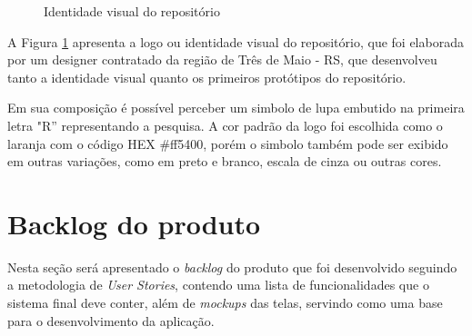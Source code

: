 \begin{figure}[H]
    \caption{Identidade visual do repositório}
    \centering
    \label{fig:resoar}
\end{figure}

A Figura \ref{fig:resoar} apresenta a logo ou identidade visual do repositório,
que foi elaborada por um designer contratado da região de Três de Maio - RS,
que desenvolveu tanto a identidade visual quanto os primeiros protótipos do repositório.

Em sua composição é possível perceber um simbolo de lupa embutido na primeira letra "R''
representando a pesquisa. A cor padrão da logo foi escolhida como o laranja com
o código HEX \#ff5400, porém o simbolo também pode ser exibido em outras variações,
como em preto e branco, escala de cinza ou outras cores.

\section{Backlog do produto}

Nesta seção será apresentado o \emph{backlog} do produto que foi desenvolvido
seguindo a metodologia de \emph{User Stories}, contendo uma lista de funcionalidades
que o sistema final deve conter, além de \emph{mockups} das telas, servindo como uma
base para o desenvolvimento da aplicação.

